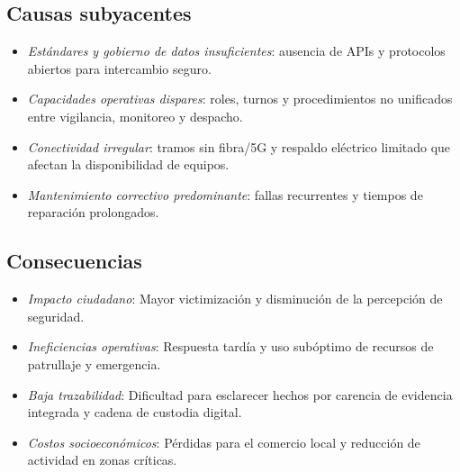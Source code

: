 \documentclass[12pt,a4paper]{article}
\begin{document}
\subsection*{Causas subyacentes}
\begin{itemize}
    \item \textit{Estándares y gobierno de datos insuficientes}: ausencia de APIs y protocolos abiertos para intercambio seguro.
    \item \textit{Capacidades operativas dispares}: roles, turnos y procedimientos no unificados entre vigilancia, monitoreo y despacho.
    \item \textit{Conectividad irregular}: tramos sin fibra/5G y respaldo eléctrico limitado que afectan la disponibilidad de equipos.
    \item \textit{Mantenimiento correctivo predominante}: fallas recurrentes y tiempos de reparación prolongados.
\end{itemize}

\subsection*{Consecuencias}
\begin{itemize}
    \item \textit{Impacto ciudadano}: Mayor victimización y disminución de la percepción de seguridad.
    \item \textit{Ineficiencias operativas}: Respuesta tardía y uso subóptimo de recursos de patrullaje y emergencia.
    \item \textit{Baja trazabilidad}: Dificultad para esclarecer hechos por carencia de evidencia integrada y cadena de custodia digital.
    \item \textit{Costos socioeconómicos}: Pérdidas para el comercio local y reducción de actividad en zonas críticas.
\end{itemize}
\end{document}
